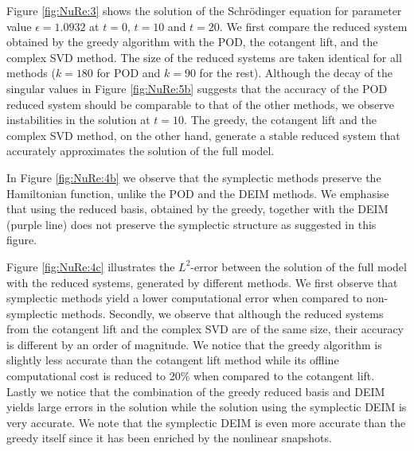Figure \ref{fig:NuRe:3} shows the solution of the Schr\"odinger equation for parameter value $\epsilon = 1.0932$ at $t=0$, $t=10$ and $t=20$. We first compare the reduced system obtained by the greedy algorithm with the POD, the cotangent lift, and the complex SVD method. The size of the reduced systems are taken identical for all methods ($k=180$ for POD and $k=90$ for the rest). Although the decay of the singular values in Figure \ref{fig:NuRe:5b} suggests that the accuracy of the POD reduced system should be comparable to that of the other methods, we observe instabilities in the solution at $t=10$. The greedy, the cotangent lift and the complex SVD method, on the other hand, generate a stable reduced system that accurately approximates the solution of the full model.

{\edit In Figure \ref{fig:NuRe:4b} we observe that the symplectic methods preserve the Hamiltonian function, unlike the POD and the DEIM methods. We emphasise that using the reduced basis, obtained by the greedy, together with the DEIM (purple line) does not preserve the symplectic structure as suggested in this figure.}

Figure \ref{fig:NuRe:4c} illustrates the $L^2$-error between the solution of the full model with the reduced systems, generated by different methods. We first observe that symplectic methods yield a lower computational error {\edit when} compared to non-symplectic methods. Secondly, we observe that although the reduced systems from the cotangent lift and the complex SVD are of the same size, their accuracy is different by an order of magnitude. We notice that the greedy algorithm is slightly less accurate than the cotangent lift method while its offline computational cost is reduced to 20\% {\edit when compared to the cotangent lift}. Lastly we notice that the combination of the greedy reduced basis and DEIM yields large errors in the solution while the solution using the symplectic DEIM is very accurate. We note that the symplectic DEIM is even more accurate than the greedy itself since it has been enriched by the nonlinear snapshots. 

